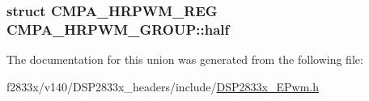 \subsubsection[{half}]{\setlength{\rightskip}{0pt plus 5cm}struct {\bf C\+M\+P\+A\+\_\+\+H\+R\+P\+W\+M\+\_\+\+R\+E\+G} C\+M\+P\+A\+\_\+\+H\+R\+P\+W\+M\+\_\+\+G\+R\+O\+U\+P\+::half}\label{union_c_m_p_a___h_r_p_w_m___g_r_o_u_p_a345359ce425c4ea7cb7b5b3b13dfb906}


The documentation for this union was generated from the following file\+:\begin{DoxyCompactItemize}
\item 
f2833x/v140/\+D\+S\+P2833x\+\_\+headers/include/\hyperlink{_d_s_p2833x___e_pwm_8h}{D\+S\+P2833x\+\_\+\+E\+Pwm.\+h}\end{DoxyCompactItemize}
